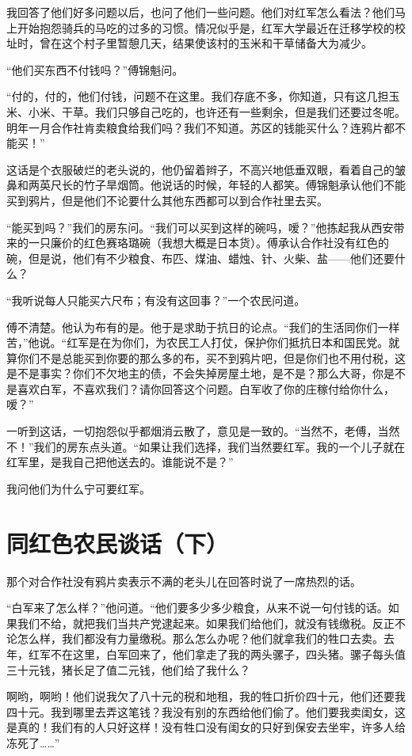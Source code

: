 \documentclass[10pt]{book}
\begin{document}
我回答了他们好多问题以后，也问了他们一些问题。他们对红军怎么看法？他们马上开始抱怨骑兵的马吃的过多的习惯。情况似乎是，红军大学最近在迁移学校的校址时，曾在这个村子里暂憩几天，结果使该村的玉米和干草储备大为减少。

“他们买东西不付钱吗？”傅锦魁问。

“付的，付的，他们付钱，问题不在这里。我们存底不多，你知道，只有这几担玉米、小米、干草。我们只够自己吃的，也许还有一些剩余，但是我们还要过冬呢。明年一月合作社肯卖粮食给我们吗？我们不知道。苏区的钱能买什么？连鸦片都不能买！”

这话是个衣服破烂的老头说的，他仍留着辫子，不高兴地低垂双眼，看着自己的皱鼻和两英尺长的竹子旱烟筒。他说话的时候，年轻的人都笑。傅锦魁承认他们不能买到鸦片，但是他们不论要什么其他东西都可以到合作社里去买。

“能买到吗？”我们的房东问。“我们可以买到这样的碗吗，嗳？”他拣起我从西安带来的一只廉价的红色赛珞璐碗（我想大概是日本货）。傅承认合作社没有红色的碗，但是说，他们有不少粮食、布匹、煤油、蜡烛、针、火柴、盐——他们还要什么？

“我听说每人只能买六尺布；有没有这回事？”一个农民问道。

傅不清楚。他认为布有的是。他于是求助于抗日的论点。“我们的生活同你们一样苦，”他说。“红军是在为你们，为农民工人打仗，保护你们抵抗日本和国民党。就算你们不是总能买到你要的那么多的布，买不到鸦片吧，但是你们也不用付税，这是不是事实？你们不欠地主的债，不会失掉房屋土地，是不是？那么大哥，你是不是喜欢白军，不喜欢我们？请你回答这个问题。白军收了你的庄稼付给你什么，嗳？”

一听到这话，一切抱怨似乎都烟消云散了，意见是一致的。“当然不，老傅，当然不！”我们的房东点头道。“如果让我们选择，我们当然要红军。我的一个儿子就在红军里，是我自己把他送去的。谁能说不是？”

我问他们为什么宁可要红军。

\section{同红色农民谈话（下）}

那个对合作社没有鸦片卖表示不满的老头儿在回答时说了一席热烈的话。

“白军来了怎么样？”他问道。“他们要多少多少粮食，从来不说一句付钱的话。如果我们不给，就把我们当共产党逮起来。如果我们给他们，就没有钱缴税。反正不论怎么样，我们都没有力量缴税。那么怎么办呢？他们就拿我们的牲口去卖。去年，红军不在这里，白军回来了，他们拿走了我的两头骡子，四头猪。骡子每头值三十元钱，猪长足了值二元钱，他们给了我什么？

啊哟，啊哟！他们说我欠了八十元的税和地租，我的牲口折价四十元，他们还要我四十元。我到哪里去弄这笔钱？我没有别的东西给他们偷了。他们要我卖闺女，这是真的！我们有的人只好这样！没有牲口没有闺女的只好到保安去坐牢，许多人给冻死了……”
\end{document}
